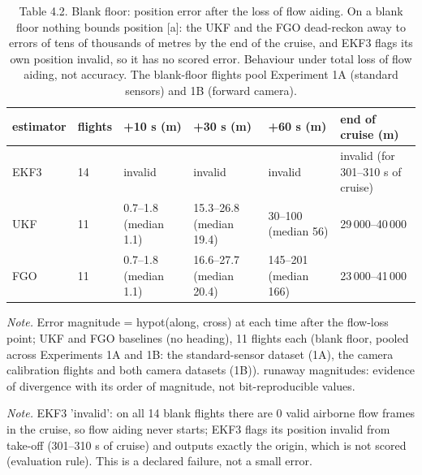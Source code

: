 \begin{table}[htbp]
\centering
\footnotesize
\caption{Table 4.2. Blank floor: position error after the loss of flow aiding. On a blank floor nothing bounds position [a]: the UKF and the FGO dead-reckon away to errors of tens of thousands of metres by the end of the cruise, and EKF3 flags its own position invalid, so it has no scored error. Behaviour under total loss of flow aiding, not accuracy. The blank-floor flights pool Experiment 1A (standard sensors) and 1B (forward camera).}
\label{tab:4-2}
\begin{tabular}{p{}p{}p{}p{}p{}p{}}
\toprule
\textbf{estimator} & \textbf{flights} & \textbf{+10 s (m)} & \textbf{+30 s (m)} & \textbf{+60 s (m)} & \textbf{end of cruise (m)} \\
\midrule
EKF3 & 14 & invalid & invalid & invalid & invalid (for 301--310 s of cruise) \\
UKF & 11 & 0.7--1.8 (median 1.1) & 15.3--26.8 (median 19.4) & 30--100 (median 56) \textdagger{} & 29\,000--40\,000 \textdagger{} \\
FGO & 11 & 0.7--1.8 (median 1.1) & 16.6--27.7 (median 20.4) & 145--201 (median 166) \textdagger{} & 23\,000--41\,000 \textdagger{} \\
\bottomrule
\end{tabular}
\par\smallskip\raggedright
\textit{Note.} Error magnitude = hypot(along, cross) at each time after the flow-loss point; UKF and FGO baselines (no heading), 11 flights each (blank floor, pooled across Experiments 1A and 1B: the standard-sensor dataset (1A), the camera calibration flights and both camera datasets (1B)). \textdagger{} runaway magnitudes: evidence of divergence with its order of magnitude, not bit-reproducible values.\par
\textit{Note.} EKF3 'invalid': on all 14 blank flights there are 0 valid airborne flow frames in the cruise, so flow aiding never starts; EKF3 flags its position invalid from take-off (301--310 s of cruise) and outputs exactly the origin, which is not scored (evaluation rule). This is a declared failure, not a small error.\par

\end{table}
